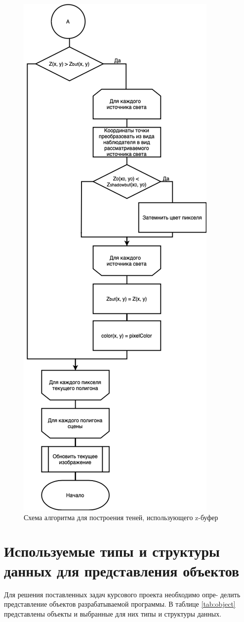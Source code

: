 \begin{figure}[h]
    \centering
    \includegraphics[width=0.5\linewidth]{img/shadow2.png}
    \caption{Схема алгоритма для построения теней, использующего z-буфер}
    \label{img:shadow2}
\end{figure}
\noindent

\clearpage
\section{Используемые типы и структуры данных для представления объектов}

Для решения поставленных задач курсового проекта необходимо опре- делить представление объектов разрабатываемой программы. 
В таблице \ref{tab:object} представлены объекты и выбранные для них типы и структуры данных.

